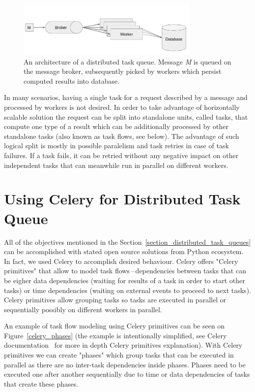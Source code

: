 \documentclass[a4paper]{llncs}
\begin{document}
\begin{figure}
  \centering
  \includegraphics[width=0.8\textwidth]{fig/architecture.png}
  \caption{An architecture of a distributed task queue. Message \emph{M} is queued on the message broker, subsequently picked by workers which persist computed results into database.}
  \label{architecture}
\end{figure}

In many scenarios, having a single task for a request described by a message and processed by workers is not desired. In order to take advantage of horizontally scalable solution the request can be split into standalone units, called tasks, that compute one type of a result which can be additionally processed by other standalone tasks (also known as task flows, see below). The advantage of such logical split is mostly in possible paralelism and task retries in case of task failures. If a task fails, it can be retried without any negative impact on other independent tasks that can meanwhile run in parallel on different workers.

\section{Using Celery for Distributed Task Queue}

All of the objectives mentioned in the Section~\ref{section_distributed_task_queues} can be accomplished with stated open source solutions from Python ecosystem. In fact, we used Celery to accomplish desired behaviour. Celery offers "Celery primitives" that allow to model task flows\,--\,dependencies between tasks that can be eigher data dependencies (waiting for results of a task in order to start other tasks) or time dependencies (waiting on external events to proceed to next tasks). Celery primitives allow grouping tasks so tasks are executed in parallel or sequentially possibly on different workers in parallel.

An example of task flow modeling using Celery primitives can be seen on Figure~\ref{celery_phases} (the example is intentionally simplified, see Celery documentation~\cite{ref_celery_docs} for more in depth Celery primitives explanation). With Celery primitives we can create "phases" which group tasks that can be executed in parallel as there are no inter-task dependencies inside phases. Phases need to be executed one after another sequentially due to time or data dependencies of tasks that create these phases.
\end{document}
